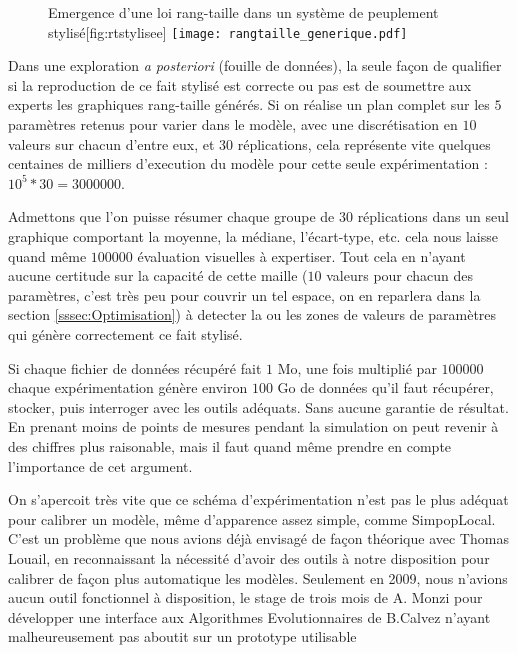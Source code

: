 \begin{figure}[h]
	\begin{sidecaption}[fortoc]{Emergence d'une loi rang-taille dans un système de peuplement stylisé}[fig:rtstylisee]
		\centering
		\texttt{[image: rangtaille\_generique.pdf]}{
		}
  \end{sidecaption}
\end{figure}

Dans une exploration \textit{a posteriori} (fouille de données), la seule façon de qualifier si la reproduction de ce fait stylisé est correcte ou pas est de soumettre aux experts les graphiques rang-taille générés. Si on réalise un plan complet sur les $5$ paramètres retenus pour varier dans le modèle, avec une discrétisation en $10$ valeurs sur chacun d'entre eux, et $30$ réplications, cela représente vite quelques centaines de milliers d'execution du modèle pour cette seule expérimentation : $10^{5} * 30 = \num{3000000}$. 

Admettons que l'on puisse résumer chaque groupe de $30$ réplications dans un seul graphique comportant la moyenne, la médiane, l'écart-type, etc. cela nous laisse quand même $\num{100000}$ évaluation visuelles à expertiser. Tout cela en n'ayant aucune certitude sur la capacité de cette maille ($10$ valeurs pour chacun des paramètres, c'est très peu pour couvrir un tel espace, on en reparlera dans la section \ref{sssec:Optimisation}) à detecter la ou les zones de valeurs de paramètres qui génère correctement ce fait stylisé.

Si chaque fichier de données récupéré fait $1$ Mo, une fois multiplié par $\num{100000}$ chaque expérimentation génère environ $100$ Go de données qu'il faut récupérer, stocker, puis interroger avec les outils adéquats. Sans aucune garantie de résultat. En prenant moins de points de mesures pendant la simulation on peut revenir à des chiffres plus raisonable, mais il faut quand même prendre en compte l'importance de cet argument. 

On s'apercoit très vite que ce schéma d'expérimentation n'est pas le plus adéquat pour calibrer un modèle, même d'apparence assez simple, comme SimpopLocal. C'est un problème que nous avions déjà envisagé de façon théorique avec Thomas Louail, en reconnaissant la nécessité d'avoir des outils à notre disposition pour calibrer de façon plus automatique les modèles. Seulement en 2009, nous n'avions aucun outil fonctionnel à disposition, le stage de trois mois de A. Monzi pour développer une interface aux Algorithmes Evolutionnaires de B.Calvez n'ayant malheureusement pas aboutit sur un prototype utilisable \autocite[140-141]{Louail2010}

